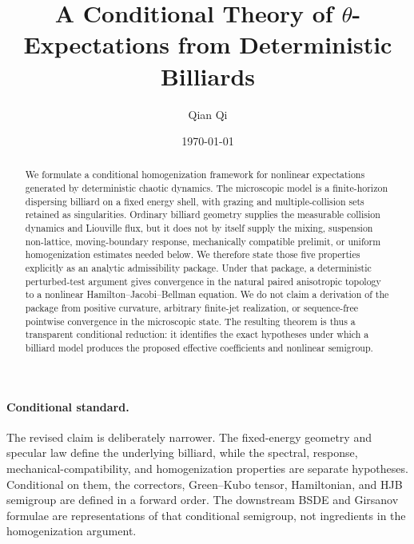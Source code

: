 \documentclass[12pt, letterpaper]{amsart}
\theoremstyle{plain}
\theoremstyle{definition}
\theoremstyle{remark}
\begin{document}
\raggedbottom

\title[A Conditional Theory of $\theta$-Expectations]{A Conditional Theory of $\theta$-Expectations from Deterministic Billiards}

\author{Qian Qi}
\address{Peking University, Beijing 100871, China}
\date{\today}



\begin{abstract}
We formulate a conditional homogenization framework for nonlinear expectations generated by deterministic chaotic dynamics.  The microscopic model is a finite-horizon dispersing billiard on a fixed energy shell, with grazing and multiple-collision sets retained as singularities.  Ordinary billiard geometry supplies the measurable collision dynamics and Liouville flux, but it does not by itself supply the mixing, suspension non-lattice, moving-boundary response, mechanically compatible prelimit, or uniform homogenization estimates needed below.  We therefore state those five properties explicitly as an analytic admissibility package.  Under that package, a deterministic perturbed-test argument gives convergence in the natural paired anisotropic topology to a nonlinear Hamilton--Jacobi--Bellman equation.  We do not claim a derivation of the package from positive curvature, arbitrary finite-jet realization, or sequence-free pointwise convergence in the microscopic state.  The resulting theorem is thus a transparent conditional reduction: it identifies the exact hypotheses under which a billiard model produces the proposed effective coefficients and nonlinear semigroup.
\end{abstract}

\maketitle

\paragraph{Conditional standard.}
The revised claim is deliberately narrower.  The fixed-energy geometry and specular law define the underlying billiard, while the spectral, response, mechanical-compatibility, and homogenization properties are separate hypotheses.  Conditional on them, the correctors, Green--Kubo tensor, Hamiltonian, and HJB semigroup are defined in a forward order.  The downstream BSDE and Girsanov formulae are representations of that conditional semigroup, not ingredients in the homogenization argument.
\end{document}
